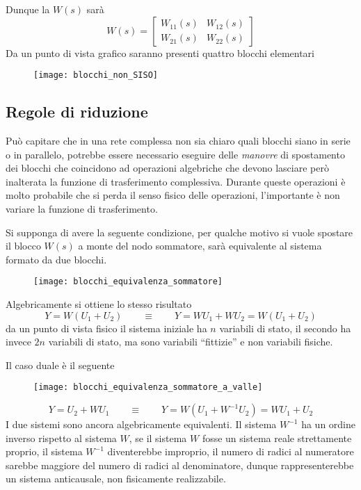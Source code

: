 Dunque la $W(s)$ sarà
$$
W(s) = \begin{bmatrix}
W_{11}(s) & W_{12}(s) \\
W_{21}(s) & W_{22}(s)
\end{bmatrix}
$$
Da un punto di vista grafico saranno presenti quattro blocchi elementari
\begin{figure}[h]
\centering
\texttt{[image: blocchi\_non\_SISO]}
\end{figure}

\subsection{Regole di riduzione}
Può capitare che in una rete complessa non sia chiaro quali blocchi siano in
serie o in parallelo, potrebbe essere necessario eseguire delle
\textit{manovre} di spostamento dei blocchi che coincidono ad operazioni
algebriche che devono lasciare però inalterata la funzione di trasferimento
complessiva.
Durante queste operazioni è molto probabile che si perda il senso fisico delle
operazioni, l'importante è non variare la funzione di trasferimento.

Si supponga di avere la seguente condizione, per qualche motivo si vuole
spostare il blocco $W(s)$ a monte del nodo sommatore, sarà equivalente al
sistema formato da due blocchi.
\begin{figure}[h]
\centering
\texttt{[image: blocchi\_equivalenza\_sommatore]}
\end{figure}
Algebricamente si ottiene lo stesso risultato
$$
Y = W(U_1+U_2) \qquad \equiv \qquad Y= WU_1 + WU_2 = W(U_1+U_2)
$$
da un punto di vista fisico il sistema iniziale ha $n$ variabili di stato, il
secondo ha invece $2n$ variabili di stato, ma sono variabili ``fittizie'' e non
variabili fisiche.

Il caso duale è il seguente
\begin{figure}[h]
\centering
\texttt{[image: blocchi\_equivalenza\_sommatore\_a\_valle]}
\end{figure}
$$
Y = U_2 + WU_1 \qquad \equiv \qquad
Y = W(U_1 + W^{-1}U_2) = WU_1 + U_2
$$
I due sistemi sono ancora algebricamente equivalenti. Il sistema $W^{-1}$ ha un
ordine inverso rispetto al sistema $W$, se il sistema $W$ fosse un sistema
reale strettamente proprio, il sistema $W^{-1}$ diventerebbe improprio, il
numero di radici al numeratore sarebbe maggiore del numero di radici al
denominatore, dunque rappresenterebbe un sistema anticausale, non fisicamente
realizzabile.

